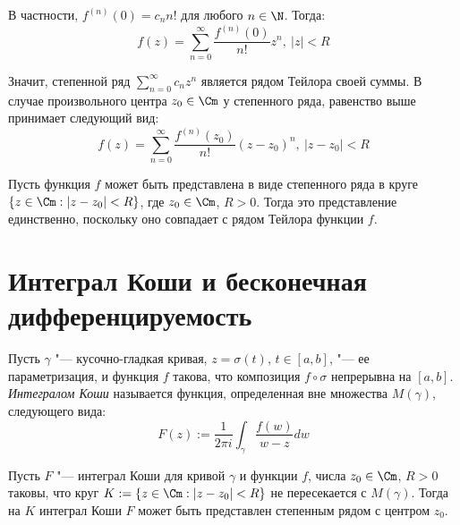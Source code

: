 \begin{note}
	В частности, $f^{(n)}(0) =c_nn!$ для любого $n \in \N$. Тогда:
	\[f(z) = \sum_{n=0}^\infty \frac{f^{(n)}(0)}{n!}z^n,~|z| < R\]
	
	Значит, степенной ряд $\sum_{n=0}^\infty c_nz^n$ является рядом Тейлора своей суммы. В случае произвольного центра $z_0 \in \Cm$ у степенного ряда, равенство выше принимает следующий вид:
	\[f(z) = \sum_{n=0}^\infty \frac{f^{(n)}(z_0)}{n!}(z - z_0)^n,~|z - z_0| < R\]
\end{note}

\begin{note}
	Пусть функция $f$ может быть представлена в виде степенного ряда в круге $\{z \in \Cm : |z - z_0| < R\}$, где $z_0 \in \Cm$, $R > 0$. Тогда это представление единственно, поскольку оно совпадает с рядом Тейлора функции $f$.
\end{note}

\section{Интеграл Коши и бесконечная дифференцируемость}

\begin{definition}
	Пусть $\gamma$ "--- кусочно-гладкая кривая, $z = \sigma(t)$, $t \in [a, b]$, "--- ее параметризация, и функция $f$ такова, что композиция $f\circ\sigma$ непрерывна на $[a, b]$. \textit{Интегралом Коши} называется функция, определенная вне множества $M(\gamma)$, следующего вида:
	\[F(z) := \frac1{2\pi i}\int_\gamma \frac{f(w)}{w - z}dw\]
\end{definition}

\begin{theorem}
	Пусть $F$ "--- интеграл Коши для кривой $\gamma$ и функции $f$, числа $z_0 \in \Cm$, $R > 0$ таковы, что круг $K := \{z \in \Cm: |z - z_0| < R\}$ не пересекается с $M(\gamma)$. Тогда на $K$ интеграл Коши $F$ может быть представлен степенным рядом с центром $z_0$.
\end{theorem}

